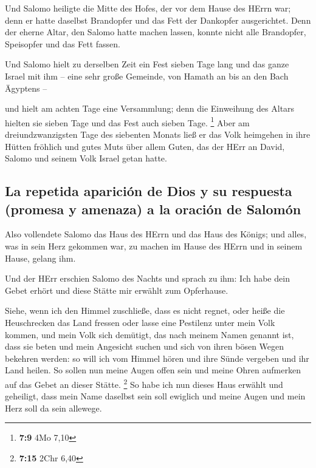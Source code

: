  Und Salomo heiligte die Mitte des Hofes, der vor dem
Hause des HErrn war; denn er hatte daselbst Brandopfer und das Fett der
Dankopfer ausgerichtet. Denn der eherne Altar, den Salomo hatte machen
lassen, konnte nicht alle Brandopfer, Speisopfer und das Fett fassen.

 Und Salomo hielt zu derselben Zeit ein Fest sieben Tage
lang und das ganze Israel mit ihm -- eine sehr große Gemeinde, von
Hamath an bis an den Bach Ägyptens --

 und hielt am achten Tage eine Versammlung; denn die
Einweihung des Altars hielten sie sieben Tage und das Fest auch sieben
Tage. \footnote{\textbf{7:9} 4Mo 7,10}  Aber am
dreiundzwanzigsten Tage des siebenten Monats ließ er das Volk heimgehen
in ihre Hütten fröhlich und gutes Muts über allem Guten, das der HErr an
David, Salomo und seinem Volk Israel getan hatte.

\hypertarget{la-repetida-apariciuxf3n-de-dios-y-su-respuesta-promesa-y-amenaza-a-la-oraciuxf3n-de-salomuxf3n}{%
\subsection{La repetida aparición de Dios y su respuesta (promesa y
amenaza) a la oración de
Salomón}\label{la-repetida-apariciuxf3n-de-dios-y-su-respuesta-promesa-y-amenaza-a-la-oraciuxf3n-de-salomuxf3n}}

 Also vollendete Salomo das Haus des HErrn und das Haus
des Königs; und alles, was in sein Herz gekommen war, zu machen im Hause
des HErrn und in seinem Hause, gelang ihm.

 Und der HErr erschien Salomo des Nachts und sprach zu
ihm: Ich habe dein Gebet erhört und diese Stätte mir erwählt zum
Opferhause.

 Siehe, wenn ich den Himmel zuschließe, dass es nicht
regnet, oder heiße die Heuschrecken das Land fressen oder lasse eine
Pestilenz unter mein Volk kommen,  und mein Volk sich
demütigt, das nach meinem Namen genannt ist, dass sie beten und mein
Angesicht suchen und sich von ihren bösen Wegen bekehren werden: so will
ich vom Himmel hören und ihre Sünde vergeben und ihr Land heilen.
 So sollen nun meine Augen offen sein und meine Ohren
aufmerken auf das Gebet an dieser Stätte. \footnote{\textbf{7:15} 2Chr
  6,40}  So habe ich nun dieses Haus erwählt und
geheiligt, dass mein Name daselbst sein soll ewiglich und meine Augen
und mein Herz soll da sein allewege.

